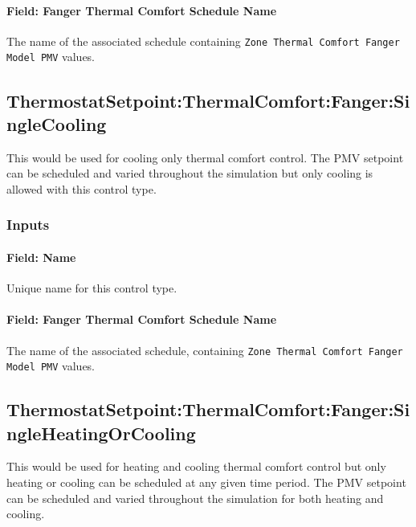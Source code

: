 \paragraph{Field: Fanger Thermal Comfort Schedule Name}\label{field-fanger-thermal-comfort-schedule-name}

The name of the associated schedule containing \lstinline!Zone Thermal Comfort Fanger Model PMV! values.

\subsection{ThermostatSetpoint:ThermalComfort:Fanger:SingleCooling}\label{thermostatsetpointthermalcomfortfangersinglecooling}

This would be used for cooling only thermal comfort control. The PMV setpoint can be scheduled and varied throughout the simulation but only cooling is allowed with this control type.

\subsubsection{Inputs}\label{inputs-11-022}

\paragraph{Field: Name}\label{field-name-9-021}

Unique name for this control type.

\paragraph{Field: Fanger Thermal Comfort Schedule Name}\label{field-fanger-thermal-comfort-schedule-name-1}

The name of the associated schedule, containing \lstinline!Zone Thermal Comfort Fanger Model PMV! values.

\subsection{ThermostatSetpoint:ThermalComfort:Fanger:SingleHeatingOrCooling}\label{thermostatsetpointthermalcomfortfangersingleheatingorcooling}

This would be used for heating and cooling thermal comfort control but only heating or cooling can be scheduled at any given time period. The PMV setpoint can be scheduled and varied throughout the simulation for both heating and cooling.

